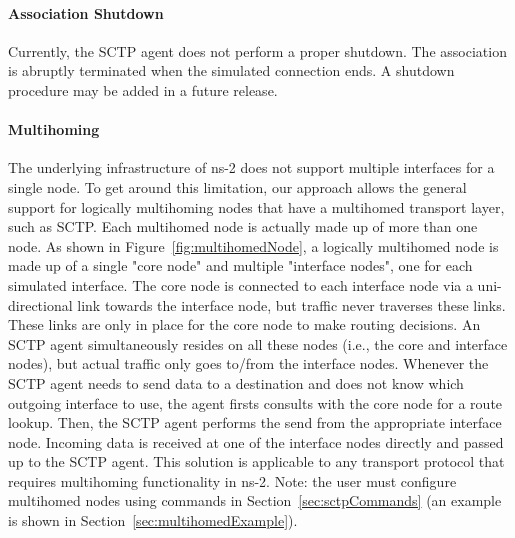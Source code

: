       \paragraph{Association Shutdown} Currently, the SCTP agent does not
      perform a proper shutdown. The association is abruptly terminated
      when the simulated connection ends. A shutdown procedure may be
      added in a future release.

      \paragraph{Multihoming} The underlying infrastructure of ns-2
      does not support multiple interfaces for a single node. To get
      around this limitation, our approach allows the general support for
      logically multihoming nodes that have a multihomed transport layer,
      such as SCTP. Each multihomed node is actually made up of more than
      one node. As shown in Figure~\ref{fig:multihomedNode}, a logically
      multihomed node is made up of a single "core node" and multiple
      "interface nodes", one for each simulated interface. The core node
      is connected to each interface node via a uni-directional link
      towards the interface node, but traffic never traverses these
      links. These links are only in place for the core node to make
      routing decisions. An SCTP agent simultaneously resides on all these
      nodes (i.e., the core and interface nodes), but actual traffic only
      goes to/from the interface nodes.  Whenever the SCTP agent needs to
      send data to a destination and does not know which outgoing
      interface to use, the agent firsts consults with the core node for a
      route lookup. Then, the SCTP agent performs the send from the
      appropriate interface node. Incoming data is received at one of the
      interface nodes directly and passed up to the SCTP agent. This
      solution is applicable to any transport protocol that requires
      multihoming functionality in ns-2. Note: the user must configure
      multihomed nodes using commands in Section~\ref{sec:sctpCommands}
      (an example is shown in Section~\ref{sec:multihomedExample}).

